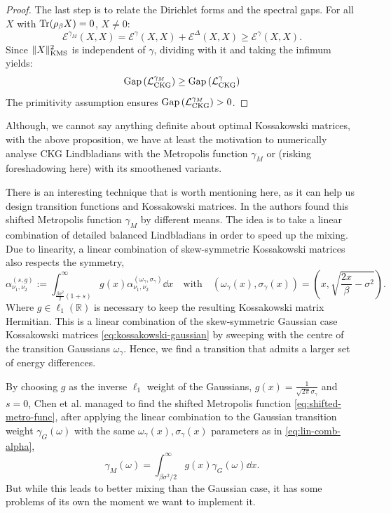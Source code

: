 \begin{proof}
    The last step is to relate the Dirichlet forms and the spectral gaps. For all $X$ with $\operatorname{Tr}(\rho_\beta X) = 0$, $X \neq 0$:
    $$  
    \mathcal{E}^{\gamma_M}(X, X) = \mathcal{E}^{\gamma}(X, X) + \mathcal{E}^{\Delta}(X, X) \geq \mathcal{E}^{\gamma}(X, X).
    $$
    Since $\|X\|^2_\textup{KMS}$ is independent of $\gamma$, dividing with it and taking the infimum yields:
    $$
    \textup{Gap}\left(\mathcal{L}_\textup{CKG}^{\gamma_M}\right) \geq \textup{Gap}\left(\mathcal{L}_\textup{CKG}^{\gamma}\right)
    $$
    The primitivity assumption ensures $\textup{Gap}\left(\mathcal{L}_\textup{CKG}^{\gamma_M}\right) > 0$.
\end{proof}

Although, we cannot say anything definite about optimal Kossakowski matrices, with the above proposition, we have at least the motivation to numerically analyse CKG Lindbladians with the Metropolis function $\gamma_M$ or (risking foreshadowing here) with its smoothened variants.

There is an interesting technique that is worth mentioning here, as it can help us design transition functions and Kossakowski matrices.
In \cite{chen2023efficient} the authors found this shifted Metropolis function $\gamma_M$ by different means. The idea is to take a linear combination of detailed balanced Lindbladians in order to speed up the mixing. Due to linearity, a linear combination of skew-symmetric Kossakowski matrices also respects the symmetry,
\begin{equation}\label{eq:lin-comb-alpha}
    \alpha_{\nu_1,\nu_2}^{(s, g)} := \int_{\frac{\beta\sigma^2}{2}(1 + s)}^\infty g(x) \alpha_{\nu_1,\nu_2}^{(\omega_\gamma, \sigma_\gamma)} \dd x \quad\text{with}\quad (\omega_\gamma(x), \sigma_\gamma(x)) = \left(x, \sqrt{\frac{2x}{\beta} - \sigma^2}\right).
\end{equation}
Where $g \in \ell_1(\mathbb{R})$ is necessary to keep the resulting Kossakowski matrix Hermitian. This is a linear combination of the skew-symmetric Gaussian case Kossakowski matrices \eqref{eq:kossakowski-gaussian} by sweeping with the centre of the transition Gaussians $\omega_\gamma$. Hence, we find a transition that admits a larger set of energy differences.

By choosing $g$ as the inverse $\ell_1$ weight of the Gaussians, $g(x) = \frac{1}{\sqrt{2\pi}\sigma_\gamma}$ and $s = 0$, Chen et al. managed to find the shifted Metropolis function \eqref{eq:shifted-metro-func}, after applying the linear combination to the Gaussian transition weight $\gamma_G(\omega)$ with the same $\omega_\gamma(x), \sigma_\gamma(x)$ parameters as in \eqref{eq:lin-comb-alpha},
\begin{equation} \label{eq:gamma_M-from-lin-comb-of-G}
    \gamma_M(\omega) = \int_{\beta\sigma^2 / 2}^\infty g(x)\gamma_G(\omega) \dd x.
\end{equation}
But while this leads to better mixing than the Gaussian case, it has some problems of its own the moment we want to implement it. 

